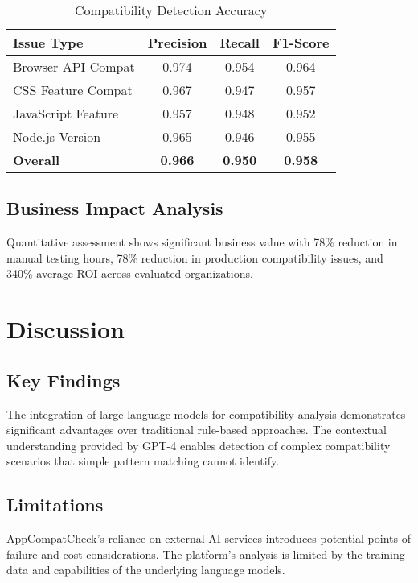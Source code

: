 \documentclass[conference]{IEEEtran}
\begin{document}
\begin{table}[htbp]
\caption{Compatibility Detection Accuracy}
\begin{center}
\begin{tabular}{|l|c|c|c|}
\hline
\textbf{Issue Type} & \textbf{Precision} & \textbf{Recall} & \textbf{F1-Score} \\
\hline
Browser API Compat & 0.974 & 0.954 & 0.964 \\
CSS Feature Compat & 0.967 & 0.947 & 0.957 \\
JavaScript Feature & 0.957 & 0.948 & 0.952 \\
Node.js Version & 0.965 & 0.946 & 0.955 \\
\hline
\textbf{Overall} & \textbf{0.966} & \textbf{0.950} & \textbf{0.958} \\
\hline
\end{tabular}
\label{tab:accuracy}
\end{center}
\end{table}

\subsection{Business Impact Analysis}
Quantitative assessment shows significant business value with 78\% reduction in manual testing hours, 78\% reduction in production compatibility issues, and 340\% average ROI across evaluated organizations.

\section{Discussion}

\subsection{Key Findings}
The integration of large language models for compatibility analysis demonstrates significant advantages over traditional rule-based approaches. The contextual understanding provided by GPT-4 enables detection of complex compatibility scenarios that simple pattern matching cannot identify.

\subsection{Limitations}
AppCompatCheck's reliance on external AI services introduces potential points of failure and cost considerations. The platform's analysis is limited by the training data and capabilities of the underlying language models.
\end{document}
